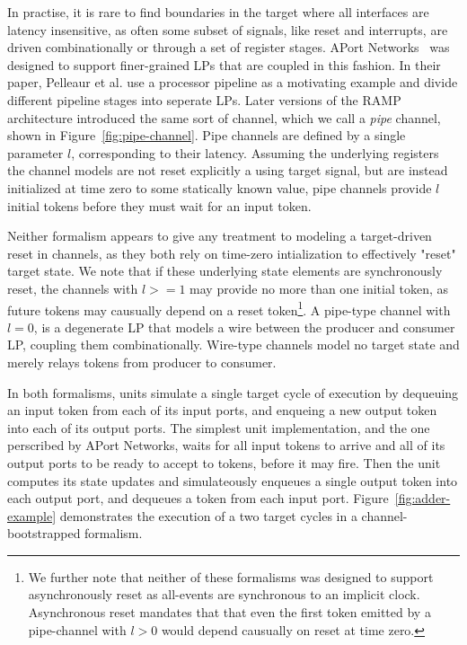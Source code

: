 In practise, it is rare to find boundaries in the target where all
interfaces are latency insensitive, as often some subset of signals, like reset
and interrupts, are driven combinationally or through a set of register stages.
APort Networks~\cite{APortNetworks} was designed to support
finer-grained LPs that are coupled in this fashion. In their
paper, Pelleaur et al. use a processor pipeline as a motivating example and
divide different pipeline stages into seperate LPs. Later versions of the RAMP
architecture introduced the same sort of channel, which we call a \emph{pipe}
channel, shown in Figure~\ref{fig:pipe-channel}.  Pipe channels are defined by
a single parameter $l$, corresponding to their latency. Assuming the underlying
registers the channel models are not reset explicitly a using target signal, but are
instead initialized at time zero to some statically known value, pipe channels
provide $l$ initial tokens before they must wait for an input token.

Neither formalism appears to give any treatment to modeling a target-driven reset in
channels, as they both rely on time-zero intialization to effectively
"reset" target state.  We note that if these underlying state elements are
synchronously reset, the channels with $l >= 1$ may provide no more than one
initial token, as future tokens may causually depend on a reset
token\footnote{We further note that neither of these formalisms was designed
to support asynchronously reset as all-events are synchronous to an implicit
clock. Asynchronous reset mandates that that even
the first token emitted by a pipe-channel with $l > 0$ would depend causually
on reset at time zero.}. A pipe-type channel with $l = 0$, is a degenerate LP
that models a wire between the producer and consumer LP, coupling them
combinationally. Wire-type channels model no target state and merely relays tokens from producer to consumer.

In both formalisms, units simulate a single target cycle of execution by dequeuing an input token
from each of its input ports, and enqueing a new output token into each of
its output ports. The simplest unit implementation, and the one perscribed by
APort Networks, waits for all input tokens to arrive and all of its output
ports to be ready to accept to tokens, before it may fire. Then the
unit computes its state updates and simulateously enqueues a single output
token into each output port, and dequeues a token from each input port.
Figure~\ref{fig:adder-example} demonstrates the execution of a two target cycles in a channel-bootstrapped formalism.

